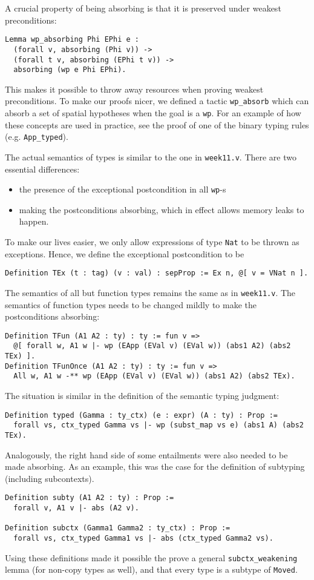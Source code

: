 \documentclass{article}
\begin{document}
A crucial property of being absorbing is that it is preserved under weakest preconditions:
\begin{lstlisting}
Lemma wp_absorbing Phi EPhi e :
  (forall v, absorbing (Phi v)) ->
  (forall t v, absorbing (EPhi t v)) ->
  absorbing (wp e Phi EPhi).
\end{lstlisting}
This makes it possible to throw away resources when proving weakest preconditions. To make our proofs nicer, we defined a tactic \texttt{wp\_absorb}
which can absorb a set of spatial hypotheses when the goal is a \texttt{wp}. For an example of how these concepts are used in practice,
see the proof of one of the binary typing rules (e.g. \texttt{App\_typed}).

The actual semantics of types is similar to the one in \texttt{week11.v}. There are two essential differences:
\begin{itemize}
  \itemsep 0pt
  \item the presence of the exceptional postcondition in all \texttt{wp}-s
  \item making the postconditions absorbing, which in effect allows memory leaks to happen.
\end{itemize}

To make our lives easier, we only allow expressions of type \texttt{Nat} to be thrown as exceptions. Hence, we define the exceptional postcondition to be
\begin{lstlisting}
Definition TEx (t : tag) (v : val) : sepProp := Ex n, @[ v = VNat n ].
\end{lstlisting}
The semantics of all but function types remains the same as in \texttt{week11.v}. The semantics of function types needs to be changed mildly
to make the postconditions absorbing:
\begin{lstlisting}
Definition TFun (A1 A2 : ty) : ty := fun v =>
  @[ forall w, A1 w |- wp (EApp (EVal v) (EVal w)) (abs1 A2) (abs2 TEx) ].
Definition TFunOnce (A1 A2 : ty) : ty := fun v =>
  All w, A1 w -** wp (EApp (EVal v) (EVal w)) (abs1 A2) (abs2 TEx).
\end{lstlisting}
The situation is similar in the definition of the semantic typing judgment:
\begin{lstlisting}
Definition typed (Gamma : ty_ctx) (e : expr) (A : ty) : Prop :=
  forall vs, ctx_typed Gamma vs |- wp (subst_map vs e) (abs1 A) (abs2 TEx).
\end{lstlisting}

Analogously, the right hand side of some entailments were also needed to be made absorbing. As an example, this was the case for the definition
of subtyping (including subcontexts).
\begin{lstlisting}
Definition subty (A1 A2 : ty) : Prop :=
  forall v, A1 v |- abs (A2 v).

Definition subctx (Gamma1 Gamma2 : ty_ctx) : Prop :=
  forall vs, ctx_typed Gamma1 vs |- abs (ctx_typed Gamma2 vs).
\end{lstlisting}
Using these definitions made it possible the prove a general \texttt{subctx\_weakening} lemma (for non-copy types as well),
and that every type is a subtype of \texttt{Moved}.
\end{document}

